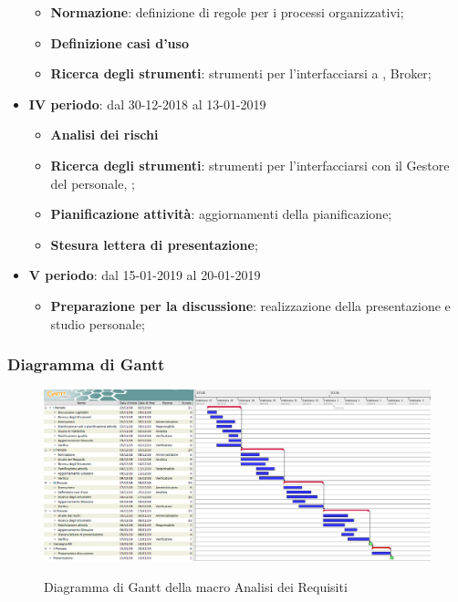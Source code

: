 \begin{itemize}
\begin{itemize}
    	        \item \textbf{Normazione}: definizione di regole per i processi organizzativi;
    	        \item \textbf{Definizione casi d'uso}
       	        \item \textbf{Ricerca degli strumenti}: strumenti per l'interfacciarsi a , Broker;
        	\end{itemize}
        	\item \textbf{IV periodo}: dal 30-12-2018 al 13-01-2019
        	\begin{itemize}
    	        \item \textbf{Analisi dei rischi}
       	        \item \textbf{Ricerca degli strumenti}: strumenti per l'interfacciarsi con il Gestore del personale, ;
       	        \item \textbf{Pianificazione attività}: aggiornamenti della pianificazione;
       	        \item \textbf{Stesura lettera di presentazione};
        	\end{itemize}
        	\item \textbf{V periodo}: dal 15-01-2019 al 20-01-2019
        	\begin{itemize}
    	        \item \textbf{Preparazione per la discussione}: realizzazione della presentazione e studio personale;
        	\end{itemize}
		\end{itemize}
		
        \begin{landscape}
			\subsubsection{Diagramma di Gantt}        
			\begin{figure}[H]
					\centering
					\includegraphics[scale=0.425]{img/Analisi_dei_Requisiti.png}\\
					\caption{Diagramma di Gantt della macro Analisi dei Requisiti}
			\end{figure}
		\end{landscape}
	

